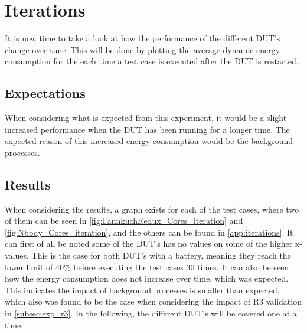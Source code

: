 \section{Iterations}\label{sec:iterations}

It is now time to take a look at how the performance of the different DUT's change over time. This will be done by plotting the average dynamic energy consumption for the each time a test case is executed after the DUT is restarted.

\subsection{Expectations}

When considering what is expected from this experiment, it would be a slight increased performance when the DUT has been running for a longer time. The expected reason of this increased energy consumption would be the background processes. 

\subsection{Results} 

When considering the results, a graph exists for each of the test cases, where two of them can be seen in \cref{fig:FannkuchRedux_Cores_iteration} and \cref{fig:Nbody_Cores_iteration}, and the others can be found in \cref{app:iterations}. It can first of all be noted some of the DUT's has no values on some of the higher x-values. This is the case for both DUT's with a battery, meaning they reach the lower limit of 40\% before executing the test cases 30 times. It can also be seen how the energy consumption does not increase over time, which was expected. This indicates the impact of background processes is smaller than expected, which also was found to be the case when considering the impact of R3 validation in \cref{subsec:exp_r3}. In the following, the different DUT's will be covered one at a time.

